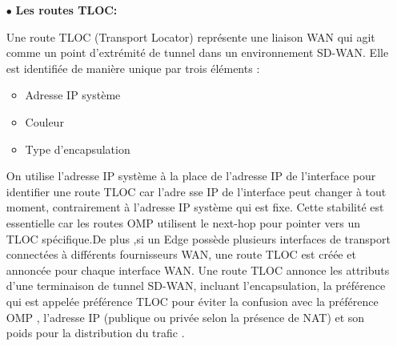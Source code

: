 	\begin{itemize}
		\item[$\bullet$]\textbf{ Les routes TLOC: } 
	
	
		Une route TLOC (Transport Locator) représente une liaison WAN qui agit comme un point d'extrémité de tunnel dans un environnement SD-WAN. Elle est identifiée de manière unique par trois éléments :
		\begin{itemize}
			\item{ 	Adresse IP système} 
		\end{itemize}
		\begin{itemize}
			\item{ Couleur} 
		\end{itemize}
		\begin{itemize}
			\item{Type d'encapsulation} 
		\end{itemize}
		
		On utilise l'adresse IP système à la place de l'adresse IP de l'interface pour identifier une route TLOC car l'adre sse IP de l'interface peut changer à tout moment, contrairement à l'adresse IP système qui est fixe. Cette stabilité est essentielle car les routes OMP utilisent le next-hop pour pointer vers un TLOC spécifique.De plus ,si un Edge possède plusieurs interfaces de transport connectées à différents fournisseurs WAN, une route TLOC est créée et annoncée pour chaque interface WAN.
		Une route TLOC annonce les attributs d'une terminaison de tunnel SD-WAN, incluant l'encapsulation, la préférence qui est appelée préférence TLOC pour éviter la confusion avec la préférence OMP , l'adresse IP (publique ou privée selon la présence de NAT) et son poids pour la distribution du trafic .
		
	\end{itemize}
	
